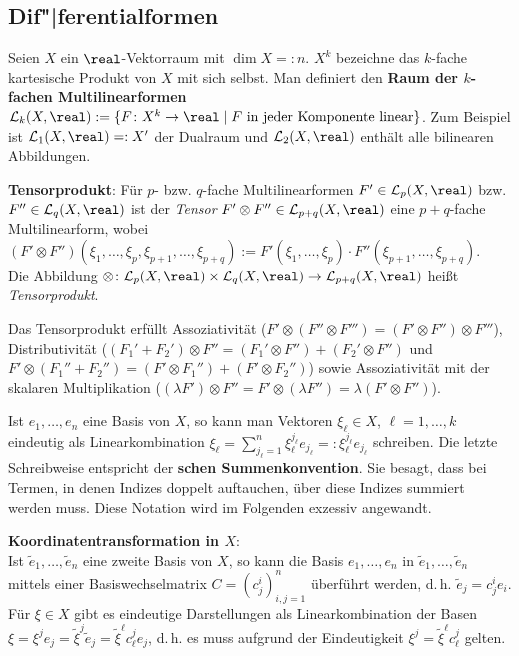 \pagebreak

\subsection{%
    Dif"|ferentialformen%
}

Seien $X$ ein $\real$-Vektorraum mit $\dim X =: n$.
$X^k$ bezeichne das $k$-fache kartesische Produkt von $X$ mit sich selbst.
Man definiert den \textbf{Raum der $k$-fachen Multilinearformen} \\
$\L_k(X, \real) := \{F\colon X^k \rightarrow \real \;|\;
F \text{ in jeder Komponente linear}\}$.
Zum Beispiel ist $\L_1(X, \real) =: X'$ der Dualraum und
$\L_2(X, \real)$ enthält alle bilinearen Abbildungen.

\textbf{Tensorprodukt}:
Für $p$- bzw. $q$-fache Multilinearformen $F' \in \L_p(X, \real)$ 
bzw. $F'' \in \L_q(X, \real)$ ist der \emph{Tensor}
$F' \otimes F'' \in \L_{p+q}(X, \real)$ eine $p + q$-fache Multilinearform,
wobei \\
$(F' \otimes F'')(\xi_1, \dotsc, \xi_p, \xi_{p+1}, \dotsc, \xi_{p+q}) :=
F'(\xi_1, \dotsc, \xi_p) \cdot F''(\xi_{p+1}, \dotsc, \xi_{p+q})$. \\
Die Abbildung $\otimes\colon \L_p(X, \real) \times \L_q(X, \real)
\rightarrow \L_{p+q}(X, \real)$ heißt \emph{Tensorprodukt}.

Das Tensorprodukt erfüllt Assoziativität
($F' \otimes (F'' \otimes F''') = (F' \otimes F'') \otimes F'''$),
Distributivität ($(F_1' + F_2') \otimes F'' =
(F_1' \otimes F'') + (F_2' \otimes F'')$ und
$F' \otimes (F_1'' + F_2'') =
(F' \otimes F_1'') + (F' \otimes F_2'')$) sowie
Assoziativität mit der skalaren Multiplikation
($(\lambda F') \otimes F'' = F' \otimes (\lambda F'') =
\lambda (F' \otimes F'')$).

\linie

Ist $e_1, \dotsc, e_n$ eine Basis von $X$, so kann man Vektoren
$\xi_\ell \in X$, $\ell = 1, \dotsc, k$ eindeutig als Linearkombination
$\xi_\ell = \sum_{j_\ell=1}^n \xi_\ell^{j_\ell} e_{j_\ell} =:
\xi_\ell^{j_\ell} e_{j_\ell}$ schreiben.
Die letzte Schreibweise entspricht der
\textbf{schen Summenkonvention}.
Sie besagt, dass bei Termen, in denen Indizes doppelt auftauchen,
über diese Indizes summiert werden muss.
Diese Notation wird im Folgenden exzessiv angewandt.

\textbf{Koordinatentransformation in $X$}: \\
Ist $\widetilde{e}_1, \dotsc, \widetilde{e}_n$ eine zweite Basis von $X$,
so kann die Basis $e_1, \dotsc, e_n$ in
$\widetilde{e}_1, \dotsc, \widetilde{e}_n$ mittels einer Basiswechselmatrix
$C = (c_j^i)_{i,j=1}^n$ überführt werden,
d.\,h. $\widetilde{e}_j = c_j^i e_i$.
Für $\xi \in X$ gibt es eindeutige Darstellungen als Linearkombination der
Basen $\xi = \xi^j e_j = \widetilde{\xi}^j \widetilde{e}_j =
\widetilde{\xi}^\ell c_\ell^j e_j$, d.\,h. es muss aufgrund der Eindeutigkeit
$\xi^j = \widetilde{\xi}^\ell c_\ell^j$ gelten.

